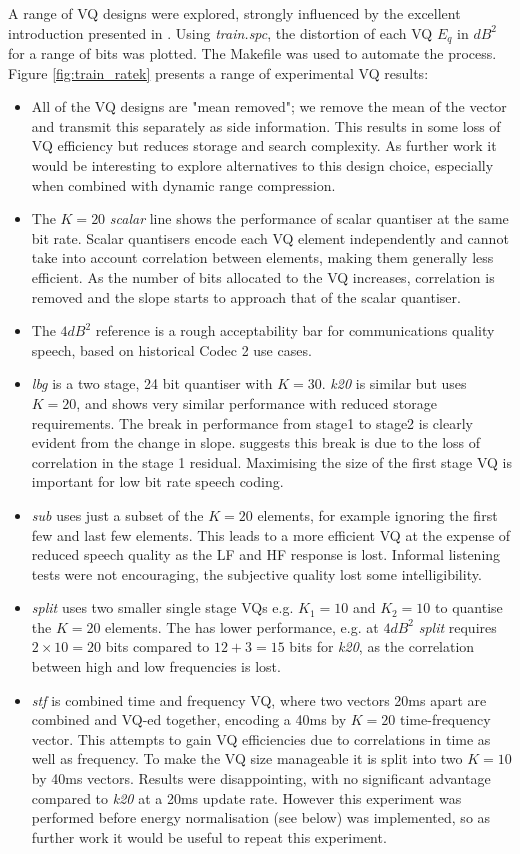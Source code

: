 \documentclass{article}
\begin{document}
A range of VQ designs were explored, strongly influenced by the excellent introduction presented in \cite{makhoul1985vector}. Using \emph{train.spc}, the  distortion of each VQ $E_q$ in $dB^2$ for a range of bits was plotted.  The Makefile  was used to automate the process. Figure \ref{fig:train_ratek} presents a range of experimental VQ results:
\begin{itemize}
\item All of the VQ designs are "mean removed"; we remove the mean of the vector and transmit this separately as side information.  This results in some loss of VQ efficiency but reduces storage and search complexity.  As further work it would be interesting to explore alternatives to this design choice, especially when combined with dynamic range compression.
\item The $K=20$ \emph{scalar} line shows the performance of scalar quantiser at the same bit rate.  Scalar quantisers encode each VQ element independently and cannot take into account correlation between elements, making them generally less efficient. As the number of bits allocated to the VQ increases, correlation is removed and the slope starts to approach that of the scalar quantiser.
\item The $4 dB^2$ reference is a rough acceptability bar for communications quality speech, based on historical Codec 2 use cases.
\item \emph{lbg} is a two stage, 24 bit quantiser with $K=30$. \emph{k20} is similar but uses $K=20$, and shows very similar performance with reduced storage requirements.  The break in performance from stage1 to stage2 is clearly evident from the change in slope.  \cite{makhoul1985vector} suggests this break is due to the loss of correlation in the stage 1 residual.  Maximising the size of the first stage VQ is important for low bit rate speech coding.
\item \emph{sub} uses just a subset of the $K=20$ elements, for example ignoring the first few and last few elements.  This leads to a more efficient VQ at the expense of reduced speech quality as the LF and HF response is lost.  Informal listening tests were not encouraging, the subjective quality lost some intelligibility.
\item \emph{split} uses two smaller single stage VQs e.g. $K_1=10$ and $K_2=10$ to quantise the $K=20$ elements.  The has lower performance, e.g. at $4 dB^2$ \emph{split} requires $2 \times 10 = 20$ bits compared to $12+3=15$ bits for \emph{k20}, as the correlation between high and low frequencies is lost.
\item \emph{stf} is combined time and frequency VQ, where two vectors 20ms apart are combined and VQ-ed together, encoding a 40ms by $K=20$ time-frequency vector.  This attempts to gain VQ efficiencies due to correlations in time as well as frequency. To make the VQ size manageable it is split into two $K=10$ by 40ms vectors.  Results were disappointing, with no significant advantage compared to \emph{k20} at a 20ms update rate. However this experiment was performed before energy normalisation (see below) was implemented, so as further work it would be useful to repeat this experiment.
\end{itemize}
\end{document}
